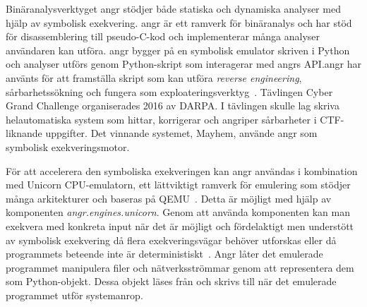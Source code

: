 Binäranalysverktyget angr stödjer både statiska och dynamiska analyser med hjälp
av symbolisk exekvering. angr är ett ramverk för binäranalys och har stöd för
disassemblering till pseudo-C-kod och implementerar många analyser användaren
kan utföra. angr bygger på en symbolisk emulator skriven i Python och analyser
utförs genom Python-skript som interagerar med angrs API.\@ angr har använts för
att framställa skript som kan utföra \emph{reverse engineering},
sårbarhetssökning och fungera som exploateringsverktyg~\cite{angr_docs}.
Tävlingen Cyber Grand Challenge organiserades 2016 av DARPA. I tävlingen skulle
lag skriva helautomatiska system som hittar, korrigerar och angriper sårbarheter
i CTF-liknande uppgifter. Det vinnande systemet, Mayhem, använde angr som
symbolisk exekveringsmotor.

För att accelerera den symboliska exekveringen kan angr användas i kombination
med Unicorn CPU-emulatorn, ett lättviktigt ramverk för emulering som stödjer
många arkitekturer och baseras på QEMU~\cite{UnicornEngine}. Detta är möjligt
med hjälp av komponenten \emph{angr.engines.unicorn}. Genom att använda
komponenten kan man exekvera med konkreta input när det är möjligt och
fördelaktigt men understött av symbolisk exekvering då flera exekveringsvägar
behöver utforskas eller då programmets beteende inte är
deterministiskt~\cite{angrUnicornEngine}. Angr låter det emulerade programmet
manipulera filer och nätverksströmmar genom att representera dem som
Python-objekt. Dessa objekt läses från och skrivs till när det emulerade
programmet utför systemanrop.

